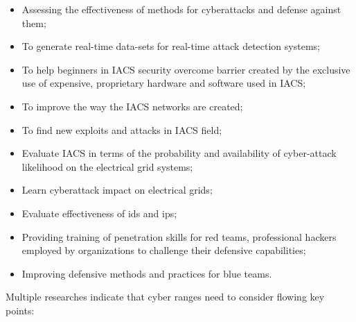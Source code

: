 \begin{itemize}
	\item Assessing the effectiveness of methods for cyberattacks and defense against them;
	
	\item To generate real-time data-sets for real-time attack detection systems;
	
	\item To help beginners in IACS security overcome barrier created by the exclusive use of expensive, proprietary hardware and software used in IACS;
	
	\item To improve the way the IACS networks are created;
	
	\item To find new exploits and attacks in IACS field;
	
	\item Evaluate IACS in terms of the probability and availability of cyber-attack likelihood on the electrical grid systems;
	
	\item Learn cyberattack impact on electrical grids;
	
	\item Evaluate effectiveness of \gls*{ids} and \gls*{ips};
	
	\item Providing training of penetration skills for red teams, professional hackers employed by organizations to challenge their defensive capabilities;
	
	\item Improving defensive methods and practices for blue teams.
	
\end{itemize}

Multiple researches \parencite{01-surway, 02-surway, 46-VPST-testbed-2009, 48-red-tee-ics-testbed, 09-iiot-testbed-architecture, 20-dsign-and-realization-of-testbeds, 22-ICS-testbed-design-and-architect, 33-SCADA-virtual-testbed, 13-experiences-in-ICS-testbeds, 35-ten-lessons-ics-testbeds} indicate that cyber ranges need to consider flowing key points:

